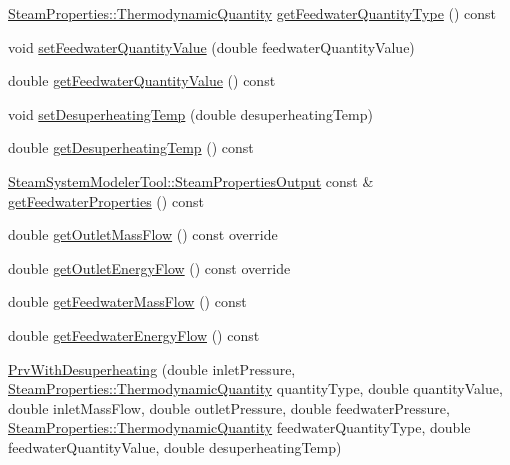 \begin{DoxyCompactItemize}
\item 
\hyperlink{class_steam_properties_ae0294bedf7d178c2d8fb6aed0f62fbff}{Steam\+Properties\+::\+Thermodynamic\+Quantity} \hyperlink{class_prv_with_desuperheating_aa6901e00ecf819d95f79c20ef1775876}{get\+Feedwater\+Quantity\+Type} () const
\item 
void \hyperlink{class_prv_with_desuperheating_afc17940f7d61898eda1bb4a6f1fea8c3}{set\+Feedwater\+Quantity\+Value} (double feedwater\+Quantity\+Value)
\item 
double \hyperlink{class_prv_with_desuperheating_a8645a251b2e77e434a8bc51dfedcad69}{get\+Feedwater\+Quantity\+Value} () const
\item 
void \hyperlink{class_prv_with_desuperheating_ade1b153c495efb451006b3c054ff386e}{set\+Desuperheating\+Temp} (double desuperheating\+Temp)
\item 
double \hyperlink{class_prv_with_desuperheating_af334a9ff9a14d110cb2851a76d5d84fb}{get\+Desuperheating\+Temp} () const
\item 
\hyperlink{struct_steam_system_modeler_tool_1_1_steam_properties_output}{Steam\+System\+Modeler\+Tool\+::\+Steam\+Properties\+Output} const  \& \hyperlink{class_prv_with_desuperheating_a8f4594109bda9bc4030c23cee9841fa8}{get\+Feedwater\+Properties} () const
\item 
double \hyperlink{class_prv_with_desuperheating_a76c03ff2f54c85cd0c80543f23549635}{get\+Outlet\+Mass\+Flow} () const override
\item 
double \hyperlink{class_prv_with_desuperheating_a2394fb62e4fc85252fc4eb15f08e9f1e}{get\+Outlet\+Energy\+Flow} () const override
\item 
double \hyperlink{class_prv_with_desuperheating_a9bd8ee7d5b563110a7279102352b8f4d}{get\+Feedwater\+Mass\+Flow} () const
\item 
double \hyperlink{class_prv_with_desuperheating_a42945a77fcdbaf1e1844c444c696f8b0}{get\+Feedwater\+Energy\+Flow} () const
\item 
\hyperlink{class_prv_with_desuperheating_adfd7f6866e8b953dcc41e51bb5b31b58}{Prv\+With\+Desuperheating} (double inlet\+Pressure, \hyperlink{class_steam_properties_ae0294bedf7d178c2d8fb6aed0f62fbff}{Steam\+Properties\+::\+Thermodynamic\+Quantity} quantity\+Type, double quantity\+Value, double inlet\+Mass\+Flow, double outlet\+Pressure, double feedwater\+Pressure, \hyperlink{class_steam_properties_ae0294bedf7d178c2d8fb6aed0f62fbff}{Steam\+Properties\+::\+Thermodynamic\+Quantity} feedwater\+Quantity\+Type, double feedwater\+Quantity\+Value, double desuperheating\+Temp)

\end{DoxyCompactItemize}
